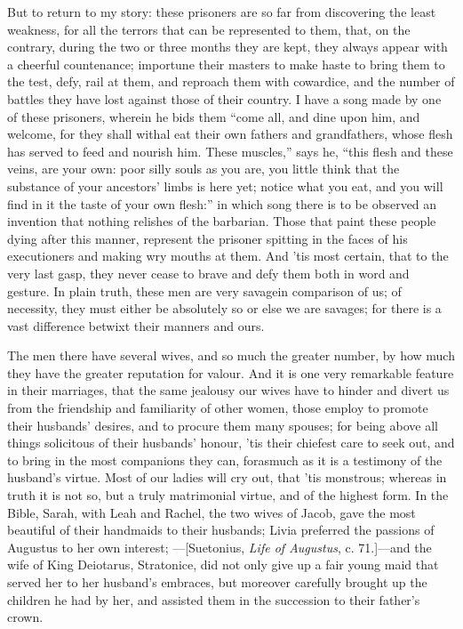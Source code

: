 \documentclass[twocolumn]{article}
\newcommand{\specialbreaks}[1]{\linebreak\newpage\noindent\setline{#1}}
\begin{document}
	But to return to my story: these prisoners are so far from discovering the least weakness, for all the terrors that can be represented to them, that, on the contrary, during the two or three months they are kept, they always appear with a cheerful countenance; importune their masters to make haste to bring them to the test, defy, rail at them, and reproach them with cowardice, and the number of battles they have lost against those of their country. I have a song made by one of these prisoners, wherein he bids them ``come all, and dine upon him, and welcome, for they shall withal eat their own fathers and grandfathers, whose flesh has served to feed and nourish him. These muscles,'' says he, ``this flesh and these veins, are your own: poor silly souls as you are, you little think that the substance of your ancestors’ limbs is here yet; notice what you eat, and you will find in it the taste of your own flesh:'' in which song there is to be observed an invention that nothing relishes of the barbarian. Those that paint these people dying after this manner, represent the prisoner spitting in the faces of his executioners and making wry mouths at them. And ’tis most certain, that to the very last gasp, they never cease to brave and defy them both in word and gesture. In plain truth, these men are very savage\specialbreaks{539}in comparison of us; of necessity, they must either be absolutely so or else we are savages; for there is a vast difference betwixt their manners and ours.

	The men there have several wives, and so much the greater number, by how much they have the greater reputation for valour. And it is one very remarkable feature in their marriages, that the same jealousy our wives have to hinder and divert us from the friendship and familiarity of other women, those employ to promote their husbands’ desires, and to procure them many spouses; for being above all things solicitous of their husbands’ honour, ’tis their chiefest care to seek out, and to bring in the most companions they can, forasmuch as it is a testimony of the husband’s virtue. Most of our ladies will cry out, that ’tis monstrous; whereas in truth it is not so, but a truly matrimonial virtue, and of the highest form. In the Bible, Sarah, with Leah and Rachel, the two wives of Jacob, gave the most beautiful of their handmaids to their husbands; Livia preferred the passions of Augustus to her own interest; ---[Suetonius, \emph{Life of Augustus}, c. 71.]---and the wife of King Deiotarus, Stratonice, did not only give up a fair young maid that served her to her husband’s embraces, but moreover carefully brought up the children he had by her, and assisted them in the succession to their father’s crown.
\end{document}
